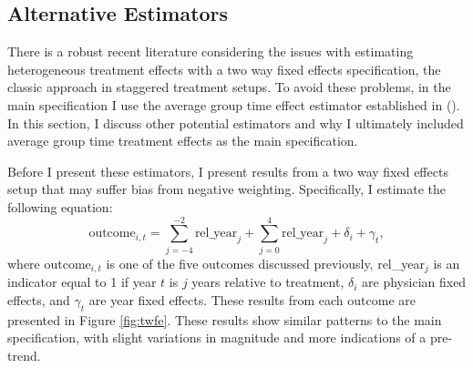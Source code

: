 \documentclass[12pt]{article}
\begin{document}
\subsection{Alternative Estimators}\label{app:estimators}

There is a robust recent literature considering the issues with estimating heterogeneous treatment effects with a two way fixed effects specification, the classic approach in staggered treatment setups. To avoid these problems, in the main specification I use the average group time effect estimator established in \citeauthor{callaway2021difference} (\citeyear{callaway2021difference}). In this section, I discuss other potential estimators and why I ultimately included average group time treatment effects as the main specification. 

Before I present these estimators, I present results from a two way fixed effects setup that may suffer bias from negative weighting. Specifically, I estimate the following equation:
$$\text{outcome}_{i,t}=\sum_{j=-4}^{-2} \text{rel\_year}_{j} + \sum_{j=0}^{4} \text{rel\_year}_{j} + \delta_i + \gamma_t,$$
where outcome$_{i,t}$ is one of the five outcomes discussed previously, rel\_year$_j$ is an indicator equal to 1 if year $t$ is $j$ years relative to treatment, $\delta_i$ are physician fixed effects, and $\gamma_t$ are year fixed effects.
These results from each outcome are presented in Figure \ref{fig:twfe}. These results show similar patterns to the main specification, with slight variations in magnitude and more indications of a pre-trend. 
\end{document}

